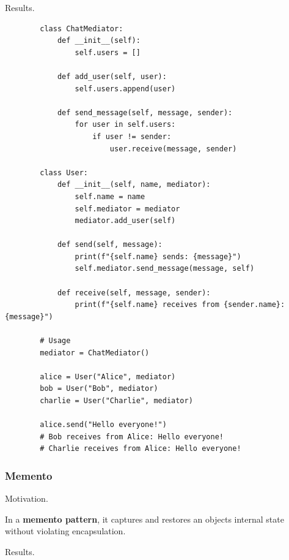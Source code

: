     Results. 

    \begin{example}
      \label{ex:case-study-11}
      \begin{lstlisting}
        class ChatMediator:
            def __init__(self):
                self.users = []
            
            def add_user(self, user):
                self.users.append(user)
            
            def send_message(self, message, sender):
                for user in self.users:
                    if user != sender:
                        user.receive(message, sender)

        class User:
            def __init__(self, name, mediator):
                self.name = name
                self.mediator = mediator
                mediator.add_user(self)
            
            def send(self, message):
                print(f"{self.name} sends: {message}")
                self.mediator.send_message(message, self)
            
            def receive(self, message, sender):
                print(f"{self.name} receives from {sender.name}: {message}")

        # Usage
        mediator = ChatMediator()

        alice = User("Alice", mediator)
        bob = User("Bob", mediator)
        charlie = User("Charlie", mediator)

        alice.send("Hello everyone!")
        # Bob receives from Alice: Hello everyone!
        # Charlie receives from Alice: Hello everyone! 
      \end{lstlisting}
    \end{example}

  \subsubsection{Memento}

    Motivation. 

    \begin{definition}[Memento]
      \label{def:memento}
      In a \textbf{memento pattern}, it captures and restores an objects internal state without violating encapsulation. 
    \end{definition}

    Results. 

